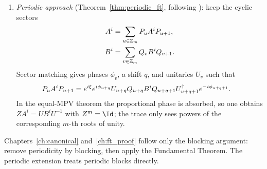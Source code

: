 \begin{remark}
\begin{enumerate}
        \item \emph{Periodic approach} (Theorem~\ref{thm:periodic_ft},
              following \cite{DeLasCuevas2017Irreducible}):
              keep the cyclic sectors
              \begin{align}
                  A^i & =\sum_{u\in\mathbb Z_m}P_uA^iP_{u+1},
                  \notag                                      \\
                  B^i & =\sum_{v\in\mathbb Z_m}Q_vB^iQ_{v+1}.
                  \notag
              \end{align}
              Sector matching gives phases $\phi_v$, a shift $q$, and unitaries
              $U_v$ such that
              \begin{align}
                  P_uA^iP_{u+1}
                   & =
                  e^{i\xi}e^{i\phi_{u+q}}
                  U_{u+q}Q_{u+q}B^iQ_{u+q+1}U_{u+q+1}^{\dagger}
                  e^{-i\phi_{u+q+1}}.
                  \notag
              \end{align}
              In the equal-MPV theorem the proportional phase is absorbed, so
              one obtains $ZA^i=UB^iU^{-1}$ with $Z^m=\Id$; the trace only sees
              powers of the corresponding $m$-th roots of unity.
    \end{enumerate}

    Chapters~\ref{ch:canonical} and~\ref{ch:ft_proof} follow only the
    blocking argument: remove periodicity by blocking, then apply the
    Fundamental Theorem. The periodic extension treats periodic blocks directly.
\end{remark}

